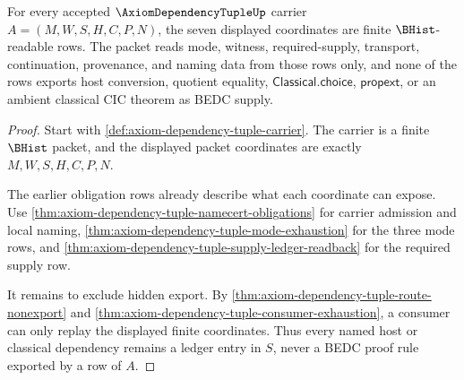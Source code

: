 \begin{theorem}
\label{thm:axiom-dependency-tuple-bhist-row-scope}
For every accepted $\AxiomDependencyTupleUp$ carrier
$A=(M,W,S,H,C,P,N)$, the seven displayed coordinates are finite
$\BHist$-readable rows. The packet reads mode, witness, required-supply,
transport, continuation, provenance, and naming data from those rows only, and
none of the rows exports host conversion, quotient equality,
$\mathsf{Classical.choice}$, $\mathsf{propext}$, or an ambient classical CIC
theorem as BEDC supply.
\end{theorem}
\begin{proof}
Start with \autoref{def:axiom-dependency-tuple-carrier}. The carrier is a
finite $\BHist$ packet, and the displayed packet coordinates are exactly
$M,W,S,H,C,P,N$.

The earlier obligation rows already describe what each coordinate can expose.
Use \autoref{thm:axiom-dependency-tuple-namecert-obligations} for carrier
admission and local naming, \autoref{thm:axiom-dependency-tuple-mode-exhaustion}
for the three mode rows, and
\autoref{thm:axiom-dependency-tuple-supply-ledger-readback} for the required
supply row.

It remains to exclude hidden export. By
\autoref{thm:axiom-dependency-tuple-route-nonexport} and
\autoref{thm:axiom-dependency-tuple-consumer-exhaustion}, a consumer can only
replay the displayed finite coordinates. Thus every named host or classical
dependency remains a ledger entry in $S$, never a BEDC proof rule exported by a
row of $A$.
\end{proof}

